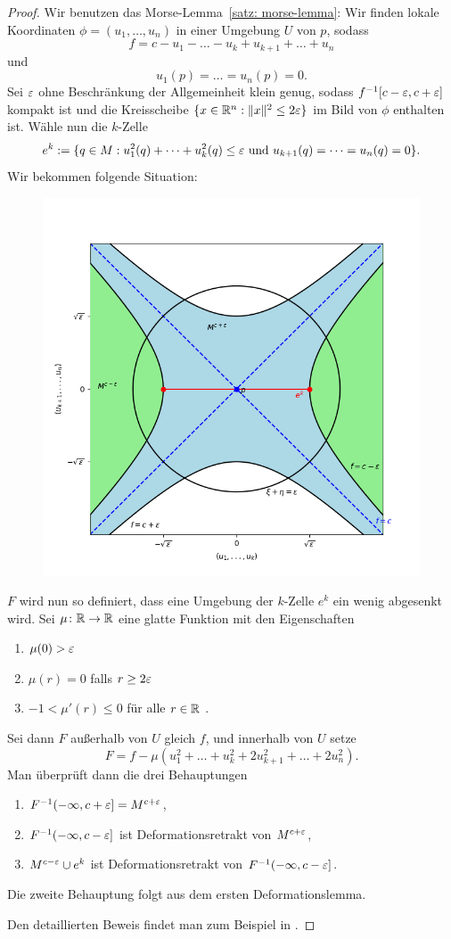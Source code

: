 \begin{proof}
    Wir benutzen das Morse-Lemma~\ref{satz: morse-lemma}:
    Wir finden lokale Koordinaten $\phi = (u_1, \dots, u_n)$ in einer Umgebung $U$ von $p$, sodass 
    \[ f = c - u_1 - \dots - u_k + u_{k + 1} + \dots + u_n \]
    und
    \[ u_1 (p) = \dots = u_n(p) = 0 . \]
    Sei $\varepsilon$ ohne Beschränkung der Allgemeinheit klein genug, sodass $f^{-1}[c - \varepsilon, c + \varepsilon]$ 
    kompakt ist und die Kreisscheibe $\{ x \in { \mathbb R }^n : \| x \|^2 \leq 2 \varepsilon \}$ im Bild von $\phi$ 
    enthalten ist. Wähle nun die $k$-Zelle 
    \[ e^k := \{ q \in M : u_1^2 (q) + \dots + u_k^2 (q) \leq \varepsilon \text{ und }
        u_{k + 1} (q) = \dots = u_n (q) = 0 \} . \]
    Wir bekommen folgende Situation:
    \begin{figure}[H]
        \centering
        \includegraphics[width=0.5\linewidth]{../resources/Me-Diagram6-U-parameterized.png}
        \label{fig:me-diagram6}
    \end{figure}
    $F$ wird nun so definiert, dass eine Umgebung der $k$-Zelle $e^k$ ein wenig abgesenkt wird.
    Sei $\mu \colon { \mathbb R } \to { \mathbb R }$ eine glatte Funktion mit den Eigenschaften
    \begin{enumerate}
        \item $\mu(0) > \varepsilon$
        \item $\mu (r) = 0$ falls $r \geq 2 \varepsilon$
        \item $-1 < \mu' (r) \leq 0$ für alle $r \in { \mathbb R }$ .
    \end{enumerate}
    Sei dann $F$ außerhalb von $U$ gleich $f$, und innerhalb von $U$ setze
    \[ F = f - \mu ( u_1^2 + \dots + u_k^2 + 2 u_{k + 1}^2 + \dots + 2 u_n^2) . \]
    Man überprüft dann die drei Behauptungen
    \begin{enumerate}
        \item $F^{-1}(- \infty, c + \varepsilon] = M^{c + \varepsilon}$,
        \item $F^{-1}(- \infty, c - \varepsilon]$ ist Deformationsretrakt von $M^{c + \varepsilon}$,
        \item $M^{c - \varepsilon} \cup e^k$ ist Deformationsretrakt von $F^{-1}(- \infty, c - \varepsilon]$.
    \end{enumerate}
    Die zweite Behauptung folgt aus dem ersten Deformationslemma.
    
    Den detaillierten Beweis findet man zum Beispiel in \cite{milnor}.
\end{proof}

